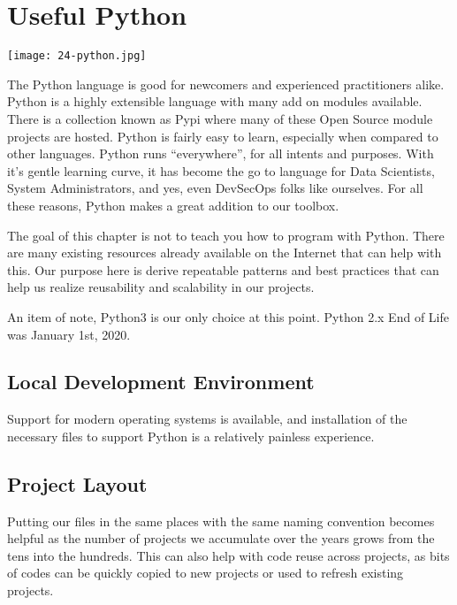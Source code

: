 \chapter{Useful Python}

\texttt{[image: 24-python.jpg]}

\justifying
The Python language is good for newcomers and experienced practitioners alike. Python is a highly extensible
language with many add on modules available. There is a collection known as Pypi where many of these Open
Source module projects are hosted. Python is fairly easy to learn, especially when compared
to other languages. Python runs ``everywhere'', for all intents and purposes. With it's gentle learning
curve, it has become the go to language for Data Scientists, System Administrators, and yes, even DevSecOps
folks like ourselves. For all these reasons, Python makes a great addition to our toolbox.

\justifying
The goal of this chapter is not to teach you how to program with Python. There are many existing resources
already available on the Internet that can help with this. Our purpose here is derive repeatable patterns
and best practices that can help us realize reusability and scalability in our projects.

\justifying
An item of note, Python3 is our only choice at this point. Python 2.x End of Life was January 1st, 2020.

\section{Local Development Environment}

\justifying
Support for modern operating systems is available, and installation of the necessary files to support Python
is a relatively painless experience.


\section{Project Layout}

\justifying
Putting our files in the same places with the same naming convention becomes helpful as the number of projects we accumulate over the years grows from the tens into the hundreds. This can also help with code reuse
across projects, as bits of codes can be quickly copied to new projects or used to refresh existing projects.

